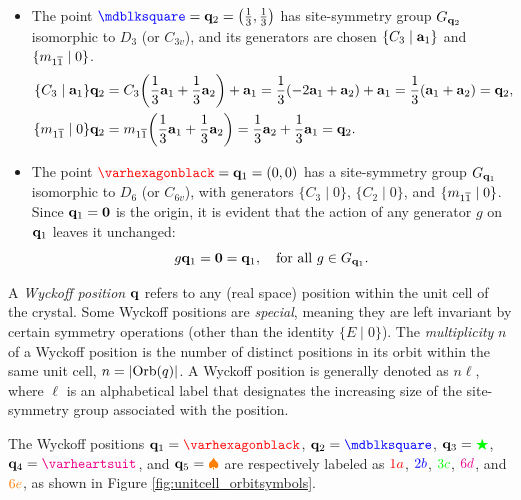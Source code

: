 \begin{example}
\begin{itemize}
\item The point $\textcolor{blue}{\mdblksquare} = \q_2 = \qty(\frac{1}{3}, \frac{1}{3})$ has site-symmetry group $G_{{\vb{q}}_2}$ isomorphic to $D_3$ (or $C_{3v}$), and its generators are chosen $\{C_3 \mid {\vb{a}}_1\}$ and $\{m_{1\overline{1}} \mid 0\}$.
\begin{align} \label{eq:site-symmetry-q2}
\{C_3 \mid {\vb{a}}_1\} {\vb{q}}_2 &= C_3 \qty(\frac{1}{3} {\vb{a}}_1 + \frac{1}{3} {\vb{a}}_2) + {\vb{a}}_1 = \frac{1}{3} \qty(-2{\vb{a}}_1 + {\vb{a}}_2) + {\vb{a}}_1 =
\frac{1}{3} ({\vb{a}}_1 + {\vb{a}}_2) = {\vb{q}}_2, \\
\{m_{1\overline{1}} \mid 0\} {\vb{q}}_2 &= m_{1\overline{1}} \qty(\frac{1}{3} {\vb{a}}_1 + \frac{1}{3} {\vb{a}}_2) =
\frac{1}{3} {\vb{a}}_2 + \frac{1}{3} {\vb{a}}_1 = {\vb{q}}_2.
\end{align}

\item The point \(\textcolor{red}{\varhexagonblack} = \q_1 = (0,0)\) has a site-symmetry group \(G_{{\vb{q}}_1}\) isomorphic to \(D_6\) (or $C_{6v}$), with generators \(\{C_3 \mid 0\}\), \(\{C_2 \mid 0\}\), and \(\{m_{1\overline{1}} \mid 0\}\). Since \({\vb{q}}_1 = {\vb{0}}\) is the origin, it is evident that the action of any generator \(g\) on \({\vb{q}}_1\) leaves it unchanged:
\begin{equation} \label{eq:site-symmetry-q1}
g {\vb{q}}_1 = {\vb{0}} = {\vb{q}}_1, \quad \text{for all } g \in G_{{\vb{q}}_1}.
\end{equation}
\end{itemize}

\end{example}

\begin{definition} \label{def:wyckpos}
A \textit{Wyckoff position} \( {\vb{q}} \) refers to any (real space) position within the unit cell of the crystal. Some Wyckoff positions are \textit{special}, meaning they are left invariant by certain symmetry operations (other than the identity $\{E \mid 0\}$). The \textit{multiplicity} $n$ of a Wyckoff position is the number of distinct positions in its orbit within the same unit cell, $n = \abs{\text{Orb}(q)}$. A Wyckoff position is generally denoted as \( n\ell \), where \( \ell \) is an alphabetical label that designates the increasing size of the site-symmetry group associated with the position.
\end{definition}

\begin{example} \label{ex:wyckpos_q1q2q3q4q5}
The Wyckoff positions \( \q_1 = \textcolor{red}{\varhexagonblack} \), \( \q_2 = \textcolor{blue}{\mdblksquare} \), \( {\vb{q}}_3 = \textcolor{green}{\bigstar} \), \( \q_4 = \textcolor{magenta}{\varheartsuit} \), and \( {\vb{q}}_5 = \textcolor{orange}{\spadesuit} \) are respectively labeled as \( \textcolor{red}{1a} \), \( \textcolor{blue}{2b} \), \( \textcolor{green}{3c} \), \( \textcolor{magenta}{6d} \), and \( \textcolor{orange}{6e} \), as shown in Figure \ref{fig:unitcell_orbitsymbols}.
\end{example}

